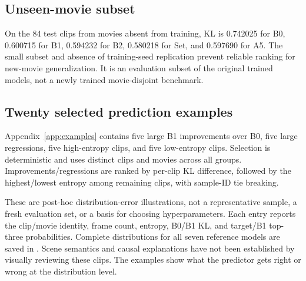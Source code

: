 \documentclass[11pt,a4paper]{article}
\begin{document}
\subsection{Unseen-movie subset}
On the 84 test clips from movies absent from training, KL is 0.742025 for B0, 0.600715 for B1, 0.594232 for B2, 0.580218 for Set, and 0.597690 for A5. The small subset and absence of training-seed replication prevent reliable ranking for new-movie generalization. It is an evaluation subset of the original trained models, not a newly trained movie-disjoint benchmark.

\subsection{Twenty selected prediction examples}
Appendix~\ref{app:examples} contains five large B1 improvements over B0, five large regressions, five high-entropy clips, and five low-entropy clips. Selection is deterministic and uses distinct clips and movies across all groups. Improvements/regressions are ranked by per-clip KL difference, followed by the highest/lowest entropy among remaining clips, with sample-ID tie breaking.

These are post-hoc distribution-error illustrations, not a representative sample, a fresh evaluation set, or a basis for choosing hyperparameters. Each entry reports the clip/movie identity, frame count, entropy, B0/B1 KL, and target/B1 top-three probabilities. Complete distributions for all seven reference models are saved in . Scene semantics and causal explanations have not been established by visually reviewing these clips. The examples show what the predictor gets right or wrong at the distribution level.
\end{document}
